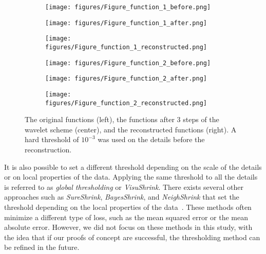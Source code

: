 \begin{figure}[htbp]
    \centering
    \begin{subfigure}[b]{0.3\textwidth}
        \texttt{[image: figures/Figure\_function\_1\_before.png]}
        \caption{}
        \label{fig:function_1_before_DWT}
    \end{subfigure}
    \begin{subfigure}[b]{0.3\textwidth}
        \texttt{[image: figures/Figure\_function\_1\_after.png]}
        \caption{}
        \label{fig:function_1_after_DWT}
    \end{subfigure}
    \begin{subfigure}[b]{0.3\textwidth}
        \texttt{[image: figures/Figure\_function\_1\_reconstructed.png]}
        \caption{}
        \label{fig:function_1_reconstructed}
    \end{subfigure}
    \begin{subfigure}[b]{0.3\textwidth}
        \texttt{[image: figures/Figure\_function\_2\_before.png]}
        \caption{}
        \label{fig:function_2_before_DWT}
    \end{subfigure}
    \begin{subfigure}[b]{0.3\textwidth}
        \texttt{[image: figures/Figure\_function\_2\_after.png]}
        \caption{}
        \label{fig:function_2_after_DWT}
    \end{subfigure}
    \begin{subfigure}[b]{0.3\textwidth}
        \texttt{[image: figures/Figure\_function\_2\_reconstructed.png]}
        \caption{}
        \label{fig:function_2_reconstructed}
    \end{subfigure}
    \caption{
        The original functions (left), the functions after 3 steps of the wavelet scheme (center), and the reconstructed functions (right).
        A hard threshold of $10^{-3}$ was used on the details before the reconstruction.
    }
    \label{fig:functions_with_DWT_and_reconstruction}
\end{figure}

It is also possible to set a different threshold depending on the scale of the details or on local properties of the data.
Applying the same threshold to all the details is referred to as \emph{global thresholding} or \emph{VisuShrink}.
There exists several other approaches such as \emph{SureShrink}, \emph{BayesShrink}, and \emph{NeighShrink} that set the threshold depending on the local properties of the data~\cite{stein1981estimation,donoho1995noising,donoho1995adapting,chang2000adaptive}.
These methods often minimize a different type of loss, such as the mean squared error or the mean absolute error.
However, we did not focus on these methods in this study, with the idea that if our proofs of concept are successful, the thresholding method can be refined in the future.

